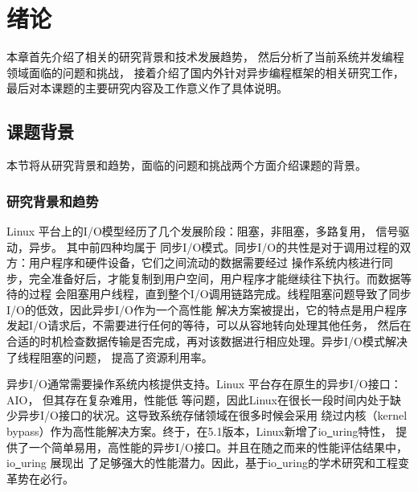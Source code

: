 \documentclass[supercite]{HustGraduPaper}
\theoremstyle{definition}
\begin{document}
\tableofcontents[level=2]
\clearpage


\section{绪论}

本章首先介绍了相关的研究背景和技术发展趋势，
然后分析了当前系统并发编程领域面临的问题和挑战，
接着介绍了国内外针对异步编程框架的相关研究工作，
最后对本课题的主要研究内容及工作意义作了具体说明。

\subsection{课题背景}

本节将从研究背景和趋势，面临的问题和挑战两个方面介绍课题的背景。\par

\subsubsection{研究背景和趋势}
Linux 平台上的I/O模型经历了几个发展阶段：阻塞，非阻塞\cite{block-io-java}，多路复用\cite{multiplex-linux}，
信号驱动\cite{signal-linux}，异步\cite{async-io-linux}。
其中前四种均属于
同步I/O模式。同步I/O的共性是对于调用过程的双方：用户程序和硬件设备，它们之间流动的数据需要经过
操作系统内核进行同步，完全准备好后，才能复制到用户空间，用户程序才能继续往下执行。而数据等待的过程
会阻塞用户线程，直到整个I/O调用链路完成。线程阻塞问题导致了同步I/O的低效，因此异步I/O作为一个高性能
解决方案被提出，它的特点是用户程序发起I/O请求后，不需要进行任何的等待，可以从容地转向处理其他任务，
然后在合适的时机检查数据传输是否完成，再对该数据进行相应处理。异步I/O模式解决了线程阻塞\cite{thread-bloking}的问题，
提高了资源利用率。\par

异步I/O通常需要操作系统内核提供支持。Linux 平台存在原生的异步I/O接口：AIO\cite{endo2020comparative}，
但其存在复杂难用，性能低
等问题，因此Linux在很长一段时间内处于缺少异步I/O接口的状况。这导致系统存储领域在很多时候会采用
绕过内核（kernel bypass\cite{chen2018survey}）作为高性能解决方案。终于，在5.1版本，Linux新增了io\underline{~}uring特性\cite{seong2020improving}，
提供了一个简单易用，高性能的异步I/O接口。并且在随之而来的性能评估结果中，io\underline{~}uring 展现出
了足够强大的性能潜力。因此，基于io\underline{~}uring的学术研究和工程变革势在必行。\par
\end{document}

